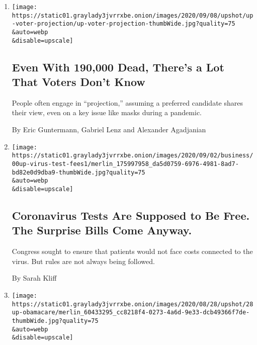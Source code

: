 \begin{enumerate}
\def\labelenumi{\arabic{enumi}.}
\item
  \href{/2020/09/10/upshot/voters-trump-virus-projection.html}{}

  \texttt{[image: https://static01.graylady3jvrrxbe.onion/images/2020/09/08/upshot/up-voter-projection/up-voter-projection-thumbWide.jpg?quality=75\\\&auto=webp\\\&disable=upscale]}

  \hypertarget{even-with-190000-dead-theres-a-lot-that-voters-dont-know}{%
  \subsection{Even With 190,000 Dead, There's a Lot That Voters Don't
  Know}\label{even-with-190000-dead-theres-a-lot-that-voters-dont-know}}

  People often engage in ``projection,'' assuming a preferred candidate
  shares their view, even on a key issue like masks during a pandemic.

  By Eric Guntermann, Gabriel Lenz and Alexander Agadjanian
\item
  \href{/2020/09/09/upshot/coronavirus-surprise-test-fees.html}{}

  \texttt{[image: https://static01.graylady3jvrrxbe.onion/images/2020/09/02/business/00up-virus-test-fees1/merlin\_175997958\_da5d0759-6976-4981-8ad7-bd82e0d9dba9-thumbWide.jpg?quality=75\\\&auto=webp\\\&disable=upscale]}

  \hypertarget{coronavirus-tests-are-supposed-to-be-free-the-surprise-bills-come-anyway}{%
  \subsection{Coronavirus Tests Are Supposed to Be Free. The Surprise
  Bills Come
  Anyway.}\label{coronavirus-tests-are-supposed-to-be-free-the-surprise-bills-come-anyway}}

  Congress sought to ensure that patients would not face costs connected
  to the virus. But rules are not always being followed.

  By Sarah Kliff
\item
  \href{/2020/08/28/upshot/republican-convention-obamacare.html}{}

  \texttt{[image: https://static01.graylady3jvrrxbe.onion/images/2020/08/28/upshot/28up-obamacare/merlin\_60433295\_cc8218f4-0273-4a6d-9e33-dcb49366f7de-thumbWide.jpg?quality=75\\\&auto=webp\\\&disable=upscale]}

  \hypertarget{a-word-not-uttered-by-republican-officials-at-the-convention-obamacare}{%
}
\end{enumerate}
